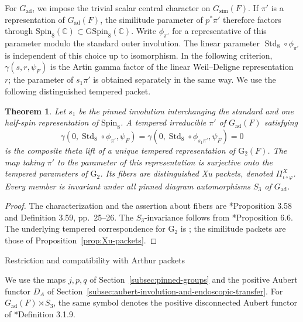 \documentclass[12pt]{amsart}
\makeatletter
\renewcommand{\subsection}{\@startsection{subsection}{2}%
  \z@{.7\linespacing\@plus.5\linespacing}{.35\linespacing}%
  {\normalfont\bfseries\raggedright}}
\theoremstyle{definition}
\theoremstyle{plain}
\newtheorem{theorem}[definition]{Theorem}
\theoremstyle{remark}
\def\C{\mathbb{C}}%
\def\Spin{\mathrm{Spin}}
\DeclareMathOperator{\Std}{Std}
\numberwithin{equation}{section}
\newcommand{\rG}{\mathrm{G}}
\newcommand{\GSpin}{\mathrm{GSpin}}
\makeatother
\begin{document}
For $G_{\mathrm{ad}}$, we impose the trivial scalar central character on
$G_{\mathrm{sim}}(F)$. If $\pi'$ is a representation of $G_{\mathrm{ad}}(F)$, the
similitude parameter of $p^*\pi'$ therefore factors through
$\Spin_8(\C)\subset\GSpin_8(\C)$. Write $\phi_{\pi'}$ for a representative
of this parameter modulo the standard outer involution.
The linear parameter $\Std_8\circ\phi_{\pi'}$ is independent of this
choice up to isomorphism. In the following criterion,
$\gamma(s,r,\psi_F)$ is the Artin gamma factor of the linear
Weil--Deligne representation $r$; the parameter of $s_1\pi'$ is
obtained separately in the same way. We use the following
distinguished tempered packet.

\begin{theorem}\label{thm:distinguished}
Let $s_1$ be the pinned involution interchanging the standard and one
half-spin representation of $\Spin_8$. A tempered irreducible $\pi'$ of
$G_{\mathrm{ad}}(F)$ satisfying
\[
 \gamma(0,\Std_8\circ\phi_{\pi'},\psi_F)=
 \gamma(0,\Std_8\circ\phi_{s_1\pi'},\psi_F)=0
\]
is the composite theta lift of a unique tempered representation of ${\rG_2}(F)$.
The map taking $\pi'$ to the parameter of this representation is surjective
onto the tempered parameters of ${\rG_2}$. Its fibers are distinguished Xu
packets, denoted $\Pi^X_{\iota\circ\varphi}$. Every member is invariant
under all pinned diagram automorphisms $S_3$ of $G_{\mathrm{ad}}$.
\end{theorem}
\begin{proof}
The characterization and the assertion about fibers are
\cite{TakanashiThesisLocal}*{Proposition 3.58 and Definition 3.59,
pp.~25--26}. The $S_3$-invariance follows from
\cite{TakanashiThesisLocal}*{Proposition 6.6}. The underlying
tempered correspondence for ${\rG_2}$ is
\cite{GanSavin2023-LocalLanglandsConjectureG2}; the similitude packets
are those of Proposition~\ref{prop:Xu-packets}.
\end{proof}


\subsection{Restriction and compatibility with Arthur packets}

We use the maps $j,p,q$ of Section~\ref{subsec:pinned-groups} and the positive
Aubert functor $D_A$ of Section~\ref{subsec:aubert-involution-and-endoscopic-transfer}.
For $G_{\mathrm{ad}}(F)\rtimes S_3$, the same symbol denotes the positive
disconnected Aubert functor of
\cite{ChengKaletha2026-AubertBernsteinInvolutionsDisconnectedGroups}*{Definition 3.1.9}.
\end{document}
